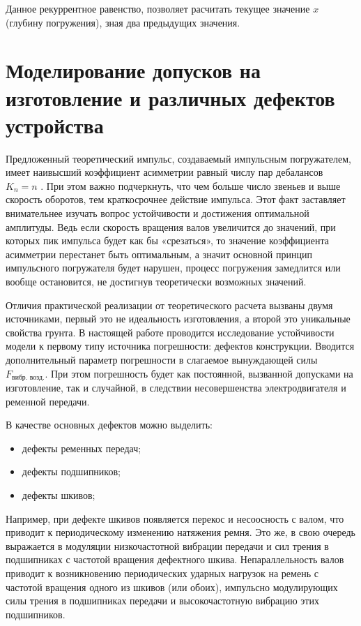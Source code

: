 \noindent Данное рекуррентное равенство, позволяет расчитать текущее значение $x$ (глубину погружения), зная два предыдущих значения.

\clearpage

\section{Моделирование допусков на изготовление и различных дефектов устройства}

Предложенный теоретический импульс, создаваемый импульсным погружателем, имеет наивысший
коэффициент асимметрии равный числу пар дебалансов $K_n=n$ \cite{kostin_va}. При этом важно подчеркнуть, что
чем больше число звеньев и выше скорость оборотов, тем краткосрочнее действие импульса. Этот факт заставляет
внимательнее изучать вопрос устойчивости и достижения оптимальной амплитуды. Ведь если скорость вращения валов
увеличится до значений, при которых пик импульса будет как бы «срезаться», то значение коэффициента асимметрии
перестанет быть оптимальным, а значит основной принцип импульсного погружателя будет нарушен, процесс погружения
замедлится или вообще остановится, не достигнув теоретически возможных значений.

Отличия практической реализации от теоретического расчета вызваны двумя источниками, первый это не идеальность изготовления,
а второй это уникальные свойства грунта. В настоящей работе проводится исследование устойчивости модели к первому типу
источника погрешности: дефектов конструкции. Вводится дополнительный параметр погрешности в слагаемое вынуждающей силы
$F_{\text{вибр. возд.}}$. При этом погрешность будет как постоянной, вызванной допусками на изготовление, так и случайной,
в следствии несовершенства электродвигателя и ременной передачи.

В качестве основных дефектов можно выделить:
\begin{itemize}
    \item дефекты ременных передач;
    \item дефекты подшипников;
    \item дефекты шкивов;
\end{itemize}
Например, при дефекте шкивов появляется перекос и несоосность с валом, что приводит к периодическому изменению натяжения ремня.
Это же, в свою очередь выражается в модуляции низкочастотной вибрации передачи и сил трения в подшипниках с частотой вращения дефектного шкива.
Непараллельность валов приводит к возникновению периодических ударных нагрузок на ремень с частотой вращения одного из шкивов (или обоих),
импульсно модулирующих силы трения в подшипниках передачи и высокочастотную вибрацию этих подшипников.

